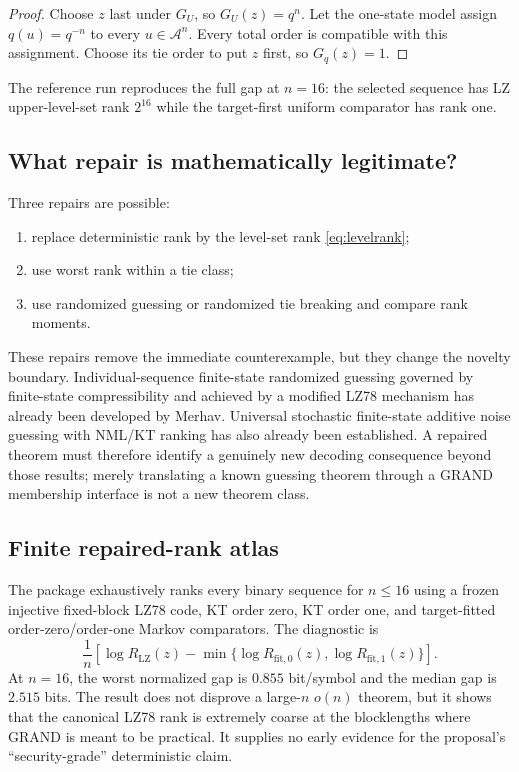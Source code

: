 \documentclass[11pt]{article}
\newcommand{\A}{\mathcal A}
\begin{document}
\begin{proof}
Choose $z$ last under $G_U$, so $G_U(z)=q^n$.  Let the one-state model assign $q(u)=q^{-n}$ to every $u\in\A^n$.  Every total order is compatible with this assignment.  Choose its tie order to put $z$ first, so $G_q(z)=1$.
\end{proof}

The reference run reproduces the full gap at $n=16$: the selected sequence has LZ upper-level-set rank $2^{16}$ while the target-first uniform comparator has rank one.

\subsection{What repair is mathematically legitimate?}

Three repairs are possible:
\begin{enumerate}
  \item replace deterministic rank by the level-set rank \eqref{eq:levelrank};
  \item use worst rank within a tie class;
  \item use randomized guessing or randomized tie breaking and compare rank moments.
\end{enumerate}
These repairs remove the immediate counterexample, but they change the novelty boundary.  Individual-sequence finite-state randomized guessing governed by finite-state compressibility and achieved by a modified LZ78 mechanism has already been developed by Merhav.  Universal stochastic finite-state additive noise guessing with NML/KT ranking has also already been established.  A repaired theorem must therefore identify a genuinely new decoding consequence beyond those results; merely translating a known guessing theorem through a GRAND membership interface is not a new theorem class.

\subsection{Finite repaired-rank atlas}

The package exhaustively ranks every binary sequence for $n\le16$ using a frozen injective fixed-block LZ78 code, KT order zero, KT order one, and target-fitted order-zero/order-one Markov comparators.  The diagnostic is
\begin{equation}
 \frac{1}{n}\left[
 \log R_{\mathrm{LZ}}(z)
 -\min\{\log R_{\mathrm{fit},0}(z),\log R_{\mathrm{fit},1}(z)\}
 \right].
\end{equation}
At $n=16$, the worst normalized gap is $0.855$ bit/symbol and the median gap is $2.515$ bits.  The result does not disprove a large-$n$ $o(n)$ theorem, but it shows that the canonical LZ78 rank is extremely coarse at the blocklengths where GRAND is meant to be practical.  It supplies no early evidence for the proposal's ``security-grade'' deterministic claim.
\end{document}

